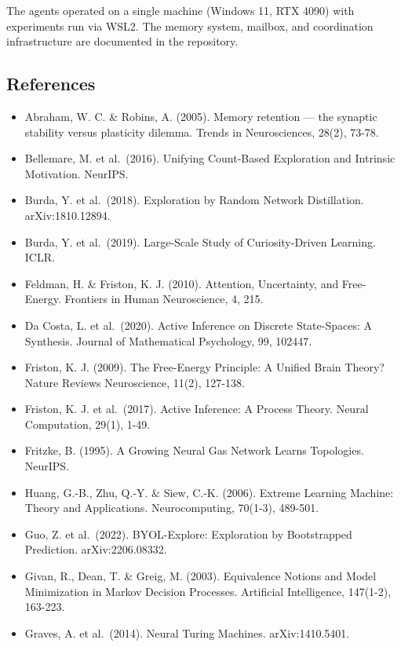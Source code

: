\documentclass[
  11pt,
]{article}
\providecommand{\tightlist}{%
  \setlength{\itemsep}{0pt}\setlength{\parskip}{0pt}}
\begin{document}
The agents operated on a single machine (Windows 11, RTX 4090) with
experiments run via WSL2. The memory system, mailbox, and coordination
infrastructure are documented in the repository.

\subsection{References}\label{references}

\begin{itemize}
\tightlist
\item
  Abraham, W. C. \& Robins, A. (2005). Memory retention --- the synaptic
  stability versus plasticity dilemma. Trends in Neurosciences, 28(2),
  73-78.
\item
  Bellemare, M. et al.~(2016). Unifying Count-Based Exploration and
  Intrinsic Motivation. NeurIPS.
\item
  Burda, Y. et al.~(2018). Exploration by Random Network Distillation.
  arXiv:1810.12894.
\item
  Burda, Y. et al.~(2019). Large-Scale Study of Curiosity-Driven
  Learning. ICLR.
\item
  Feldman, H. \& Friston, K. J. (2010). Attention, Uncertainty, and
  Free-Energy. Frontiers in Human Neuroscience, 4, 215.
\item
  Da Costa, L. et al.~(2020). Active Inference on Discrete State-Spaces:
  A Synthesis. Journal of Mathematical Psychology, 99, 102447.
\item
  Friston, K. J. (2009). The Free-Energy Principle: A Unified Brain
  Theory? Nature Reviews Neuroscience, 11(2), 127-138.
\item
  Friston, K. J. et al.~(2017). Active Inference: A Process Theory.
  Neural Computation, 29(1), 1-49.
\item
  Fritzke, B. (1995). A Growing Neural Gas Network Learns Topologies.
  NeurIPS.
\item
  Huang, G.-B., Zhu, Q.-Y. \& Siew, C.-K. (2006). Extreme Learning
  Machine: Theory and Applications. Neurocomputing, 70(1-3), 489-501.
\item
  Guo, Z. et al.~(2022). BYOL-Explore: Exploration by Bootstrapped
  Prediction. arXiv:2206.08332.
\item
  Givan, R., Dean, T. \& Greig, M. (2003). Equivalence Notions and Model
  Minimization in Markov Decision Processes. Artificial Intelligence,
  147(1-2), 163-223.
\item
  Graves, A. et al.~(2014). Neural Turing Machines. arXiv:1410.5401.

\end{itemize}
\end{document}
